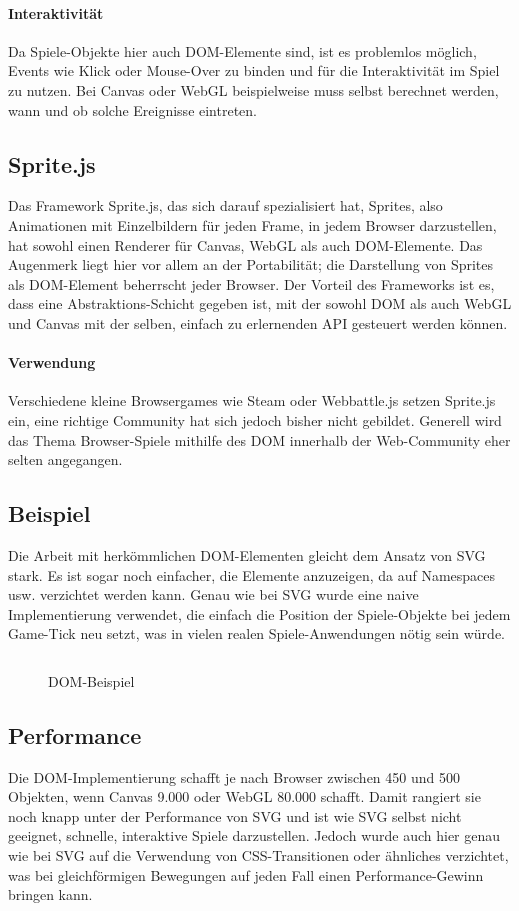 \documentclass[a4paper, 12pt]{article}
\begin{document}
\paragraph{Interaktivität} Da Spiele-Objekte hier auch DOM-Elemente sind, ist es problemlos möglich, Events wie Klick oder Mouse-Over zu binden und für die Interaktivität im Spiel zu nutzen. Bei Canvas oder WebGL beispielweise muss selbst berechnet werden, wann und ob solche Ereignisse eintreten.
\subsection{Sprite.js}
Das Framework  Sprite.js, das sich darauf spezialisiert hat, Sprites, also Animationen mit Einzelbildern für jeden Frame, in jedem Browser darzustellen, hat sowohl einen Renderer für Canvas, WebGL als auch DOM-Elemente. Das Augenmerk liegt hier vor allem an der Portabilität; die Darstellung von Sprites als DOM-Element beherrscht jeder Browser. Der Vorteil des Frameworks ist es, dass eine Abstraktions-Schicht gegeben ist, mit der sowohl DOM als auch WebGL und Canvas mit der selben, einfach zu erlernenden API gesteuert werden können.\cite{SpriteJS}
\paragraph{Verwendung} Verschiedene kleine Browsergames wie Steam oder Webbattle.js setzen Sprite.js ein, eine richtige Community hat sich jedoch bisher nicht gebildet. Generell wird das Thema Browser-Spiele mithilfe des DOM innerhalb der Web-Community eher selten angegangen.
\subsection{Beispiel}
Die Arbeit mit herkömmlichen DOM-Elementen gleicht dem Ansatz von SVG stark. Es ist sogar noch einfacher, die Elemente anzuzeigen, da auf Namespaces usw. verzichtet werden kann. Genau wie bei SVG wurde eine naive Implementierung verwendet, die einfach die Position der Spiele-Objekte bei jedem Game-Tick neu setzt, was in vielen realen Spiele-Anwendungen nötig sein würde.
\begin{figure}[H]
	\inputminted{javascript}{assets/vanilladom_example.js}
	\caption{DOM-Beispiel}
	\label{dom_example}
\end{figure}
\newpage
\subsection{Performance}
Die DOM-Implementierung schafft je nach Browser zwischen 450 und 500 Objekten, wenn Canvas 9.000 oder WebGL 80.000 schafft. Damit rangiert sie noch knapp unter der Performance von SVG und ist wie SVG selbst nicht geeignet, schnelle, interaktive Spiele darzustellen. Jedoch wurde auch hier genau wie bei SVG auf die Verwendung von CSS-Transitionen oder ähnliches verzichtet, was bei gleichförmigen Bewegungen auf jeden Fall einen Performance-Gewinn bringen kann.
\end{document}
